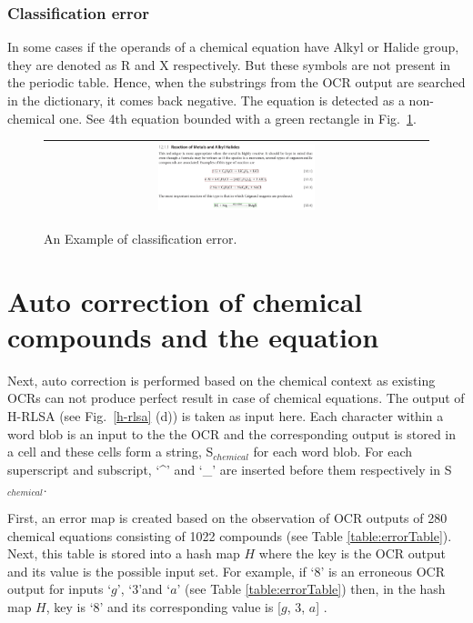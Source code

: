 \documentclass[oneside,a4paper,12pt]{book}
\begin{document}
\subsubsection{Classification error}
 In some cases if the operands of a chemical equation have Alkyl or Halide group, 
 they are denoted as R and X respectively. 
 But these symbols are not present in the periodic table.
 Hence, when the substrings from the OCR output are searched in the dictionary, it comes back negative.
 The equation is detected as a non-chemical one. See 4th equation bounded with a green rectangle in Fig.~\ref{cl_error}.  
\begin{figure}[h]\center\footnotesize
\begin{tabular}{|c|}
\hline
 \includegraphics[width=0.42\textwidth]{cbook16.png} \\ \hline
 \end{tabular} 
 \caption{An Example of classification error.}
 \label{cl_error}
\end{figure}



\section{Auto correction of chemical compounds and the equation}

Next, auto correction is performed based on the chemical context as existing OCRs can not produce perfect result in case of chemical equations.  The output of H-RLSA  (see Fig.~\ref{h-rlsa} (d)) is taken as input here. 
Each character within a word blob is an input to the the OCR and the corresponding output  is stored in a cell and these cells form a string, S$_{chemical}$ for each word blob. For each superscript and subscript, `\^{}'  and  `\_' are inserted before them respectively in S$_{chemical}$.

 First, an error map is created based on the observation of OCR outputs of 280 chemical equations consisting of 1022 compounds (see Table \ref{table:errorTable}). Next, this table is stored into a hash map $H$ where the key is the OCR output and its value is the possible input set.
For example, if `$8$' is an erroneous OCR output for inputs `$g$', `$3$'and `$a$' (see Table \ref{table:errorTable}) then, in the hash map $H$, key is `$8$' and its corresponding value is [$g$, $3$, $a$] .
\end{document}
